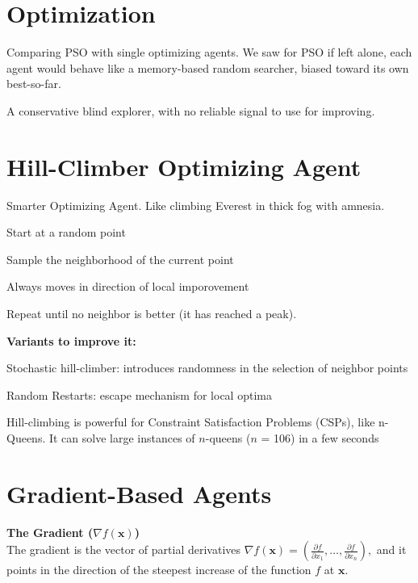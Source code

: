 \section*{Optimization}

Comparing PSO with single optimizing agents. We saw for PSO 
if left alone, each agent would behave like a memory-based random searcher,
biased toward its own best-so-far. 

A conservative blind explorer, with no reliable signal to use for improving.

\section*{Hill-Climber Optimizing Agent}

Smarter Optimizing Agent. Like climbing Everest in thick fog with amnesia.

\begin{tightitemize}
    \item Start at a random point
    \item Sample the neighborhood of the current point
    \item Always moves in direction of local imporovement
    \item Repeat until no neighbor is better (it has reached a peak).
\end{tightitemize}

\textbf{Variants to improve it:}
\begin{tightitemize}
    \item Stochastic hill-climber: introduces randomness in the selection of neighbor points
    \item Random Restarts: escape mechanism for local optima
\end{tightitemize}

Hill-climbing is powerful for Constraint Satisfaction Problems (CSPs), like n-Queens.
It can solve large instances of $n$-queens ($n$ = 106) in a few seconds

\section*{Gradient-Based Agents}

\textbf{The Gradient ($\nabla f(\mathbf{x})$)}\\
The gradient is the vector of partial derivatives 
$
\nabla f(\mathbf{x}) = \left(\frac{\partial f}{\partial x_1}, \dots, \frac{\partial f}{\partial x_n}\right),
$ 
and it points in the direction of the steepest increase of the function $f$ at $\mathbf{x}$.

